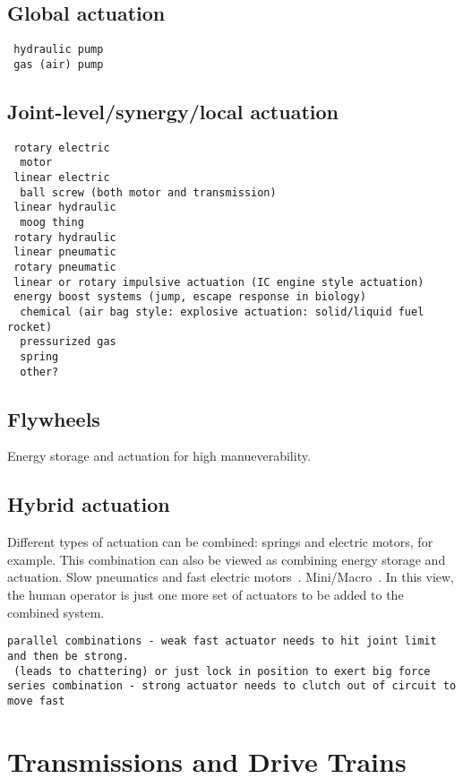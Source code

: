\documentclass[letterpaper,12pt,fullpage]{article}
\begin{document}
\subsection{Global actuation}

\begin{verbatim}
 hydraulic pump 
 gas (air) pump
\end{verbatim}

\subsection{Joint-level/synergy/local actuation}

\begin{verbatim}
 rotary electric
  motor
 linear electric
  ball screw (both motor and transmission)
 linear hydraulic
  moog thing
 rotary hydraulic
 linear pneumatic
 rotary pneumatic
 linear or rotary impulsive actuation (IC engine style actuation)
 energy boost systems (jump, escape response in biology)
  chemical (air bag style: explosive actuation: solid/liquid fuel rocket)
  pressurized gas
  spring
  other?
\end{verbatim}

\subsection{Flywheels}

Energy storage and actuation for high manueverability.

\subsection{Hybrid actuation}

Different types of actuation can be combined: springs and electric motors,
for example. This combination can also be viewed as combining energy
storage and actuation. Slow pneumatics and fast electric motors~\cite{Morimoto,UCLA}.
Mini/Macro~\cite{Stanford}. In this view, the human operator is just
one more set of actuators to be added to the combined system.

\begin{verbatim}
parallel combinations - weak fast actuator needs to hit joint limit and then be strong.
 (leads to chattering) or just lock in position to exert big force
series combination - strong actuator needs to clutch out of circuit to move fast
\end{verbatim}

\section{Transmissions and Drive Trains}
\end{document}
